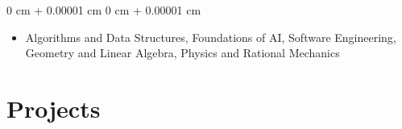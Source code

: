 \documentclass[11pt, letterpaper]{article}
\newenvironment{highlights}{
    \begin{itemize}[
        topsep=0.10 cm,
        parsep=0.10 cm,
        partopsep=0pt,
        itemsep=0pt,
        leftmargin=0 cm + 10pt
    ]
}{
    \end{itemize}
} %
\newenvironment{onecolentry}{
    \begin{adjustwidth}{
        0 cm + 0.00001 cm
    }{
        0 cm + 0.00001 cm
    }
}{
    \end{adjustwidth}
} %
\begin{document}
    \vspace{0.10 cm}
    \begin{onecolentry}
        \begin{highlights}
            \item {} Algorithms and Data Structures, Foundations of AI, Software Engineering, Geometry and Linear Algebra, Physics and Rational Mechanics
        \end{highlights}
    \end{onecolentry}



\section{Projects}

\vspace{0.10 cm}
\end{document}
